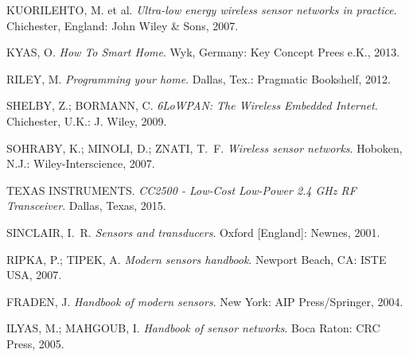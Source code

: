 {KUORILEHTO, M. et al. \emph{Ultra-low energy wireless sensor networks in
  practice}. Chichester, England: John Wiley & Sons, 2007.}

{KYAS, O. \emph{How To Smart Home}. Wyk, Germany: Key Concept Prees e.K.,
  2013.}

{RILEY, M. \emph{Programming your home}. Dallas, Tex.: Pragmatic Bookshelf,
  2012.}

{SHELBY, Z.; BORMANN, C. \emph{6LoWPAN: The Wireless Embedded Internet}.
  Chichester, U.K.: J. Wiley, 2009.}

{SOHRABY, K.; MINOLI, D.; ZNATI, T.~F. \emph{Wireless sensor networks}.
  Hoboken, N.J.: Wiley-Interscience, 2007.}

{TEXAS INSTRUMENTS. \emph{CC2500 - Low-Cost Low-Power 2.4 GHz RF Transceiver}.
Dallas, Texas, 2015.}

{SINCLAIR, I.~R. \emph{Sensors and transducers}. Oxford [England]: Newnes,
  2001.}

{RIPKA, P.; TIPEK, A. \emph{Modern sensors handbook}. Newport Beach, CA: ISTE
  USA, 2007.}

{FRADEN, J. \emph{Handbook of modern sensors}. New York: AIP Press/Springer,
  2004.}

{ILYAS, M.; MAHGOUB, I. \emph{Handbook of sensor networks}. Boca Raton: CRC
  Press, 2005.}
